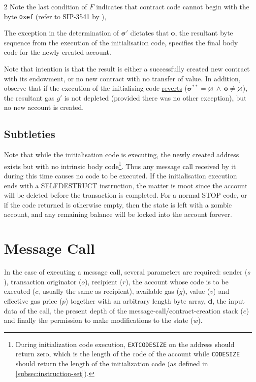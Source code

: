 \documentclass[9pt,oneside]{amsart}
\begin{document}
\begin{multicols}{2}
Note the last condition of $F$ indicates that contract code cannot begin with the byte \texttt{0xef} (refer to SIP-3541 by \cite{SIP-3541}),

The exception in the determination of $\boldsymbol{\sigma}'$ dictates that $\mathbf{o}$, the resultant byte sequence from the execution of the initialisation code, specifies the final body code for the newly-created account.

Note that intention is that the result is either a successfully created new contract with its endowment, or no new contract with no transfer of value.
In addition, observe that if the execution of the initialising code \hyperlink{REVERT}{reverts} ($\boldsymbol{\sigma}^{**} = \varnothing \ \wedge\ \mathbf{o} \neq \varnothing$), the resultant gas $g'$ is not depleted (provided there was no other exception), but no new account is created.

\subsection{Subtleties}
Note that while the initialisation code is executing, the newly created address exists but with no intrinsic body code\footnote{During initialization code execution, \texttt{EXTCODESIZE} on the address should return zero, which is the length of the code of the account while \texttt{CODESIZE} should return the length of the initialization code (as defined in \ref{subsec:instruction-set}).}. Thus any message call received by it during this time causes no code to be executed. If the initialisation execution ends with a {\small SELFDESTRUCT} instruction, the matter is moot since the account will be deleted before the transaction is completed. For a normal {\small STOP} code, or if the code returned is otherwise empty, then the state is left with a zombie account, and any remaining balance will be locked into the account forever.

\section{Message Call} \label{ch:call}
In the case of executing a message call, several parameters are required: sender ($s$), transaction originator ($o$), recipient ($r$), the account whose code is to be executed ($c$, usually the same as recipient), available gas ($g$), value ($v$) and effective gas price ($p$) together with an arbitrary length byte array, $\mathbf{d}$, the input data of the call, the present depth of the message-call/contract-creation stack ($e$) and finally the permission to make modifications to the state ($w$).


\end{multicols}
\end{document}
